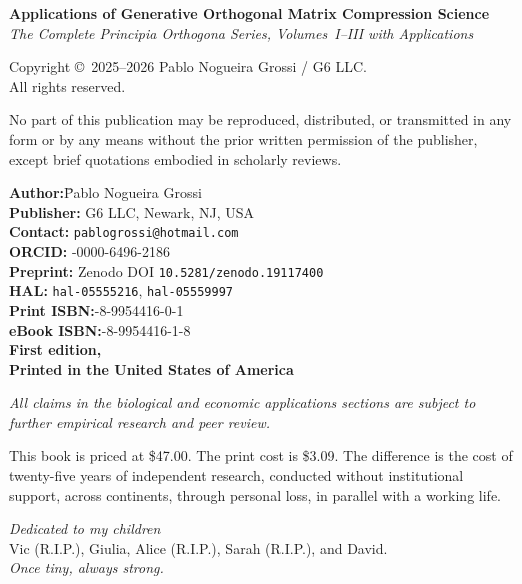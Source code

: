 \documentclass[11pt, twoside, openright]{book}
\theoremstyle{plain}
\theoremstyle{definition}
\begin{document}
\thispagestyle{empty}
{\small
\noindent\textbf{Applications of Generative Orthogonal Matrix Compression Science}\\
\textit{The Complete Principia Orthogona Series, Volumes~I--III with Applications}

\bigskip
\noindent Copyright \copyright\ 2025--2026 Pablo Nogueira Grossi / G6 LLC.\\
All rights reserved.

\medskip
No part of this publication may be reproduced, distributed, or transmitted
in any form or by any means without the prior written permission of the
publisher, except brief quotations embodied in scholarly reviews.

\bigskip
\begin{tabbing}
\textbf{Author:}\hspace{1.2cm}\=Pablo Nogueira Grossi\\
\textbf{Publisher:} \> G6 LLC, Newark, NJ, USA\\
\textbf{Contact:}   \> \texttt{pablogrossi@hotmail.com}\\
\textbf{ORCID:}     -0000-6496-2186\\[6pt]
\textbf{Preprint:}  \> Zenodo DOI \texttt{10.5281/zenodo.19117400}\\
\textbf{HAL:}       \> \texttt{hal-05555216}, \texttt{hal-05559997}\\[6pt]
\textbf{Print ISBN:}-8-9954416-0-1\\
\textbf{eBook ISBN:}-8-9954416-1-8\\[6pt]
\textbf{First edition,} \\
\textbf{Printed in the United States of America}
\end{tabbing}

\medskip
\noindent\textit{All claims in the biological and economic applications sections are
subject to further empirical research and peer review.}

\medskip
\noindent This book is priced at \$47.00. The print cost is \$3.09.
The difference is the cost of twenty-five years of independent research,
conducted without institutional support, across continents, through
personal loss, in parallel with a working life.
}
\cleardoublepage

\thispagestyle{empty}
\vspace*{5cm}
\begin{center}
\textit{Dedicated to my children}\\[6pt]
Vic (R.I.P.), Giulia, Alice (R.I.P.), Sarah (R.I.P.), and David.\\[10pt]
\textit{Once tiny, always strong.}
\end{center}
\cleardoublepage
\end{document}
